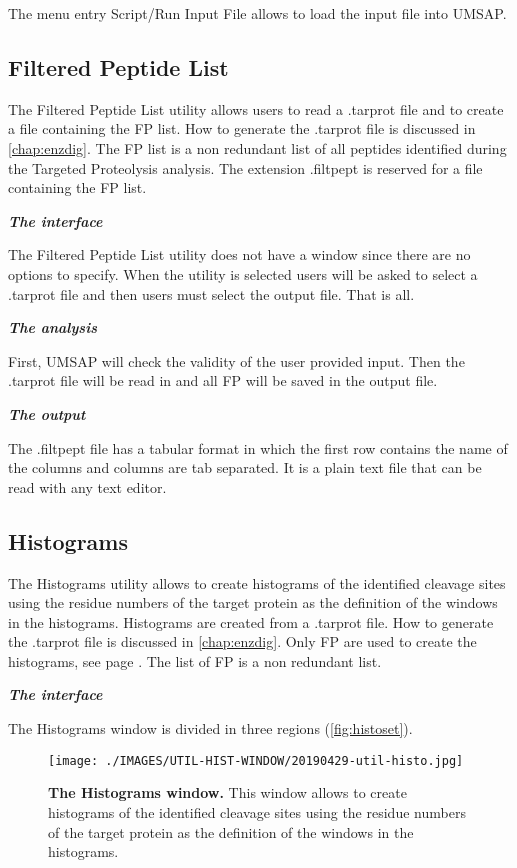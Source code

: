 The menu entry Script/Run Input File allows to load the input file into UMSAP.

\subsection{Filtered Peptide List}
\label{subsec:filtpeptfile}

The Filtered Peptide List utility allows users to read a .tarprot file and to create a file containing the FP list. How to generate the .tarprot file is discussed in \autoref{chap:enzdig}. The FP list is a non redundant list of all peptides identified during the Targeted Proteolysis analysis. The extension .filtpept is reserved for a file containing the FP list.

\textit{\textbf{The interface}}

The Filtered Peptide List utility does not have a window since there are no options to specify. When the utility is selected users will be asked to select a .tarprot file and then users must select the output file. That is all.

\textit{\textbf{The analysis}}

First, UMSAP will check the validity of the user provided input. Then the .tarprot file will be read in and all FP will be saved in the output file.

\textit{\textbf{The output}}

The .filtpept file has a tabular format in which the first row contains the name of the columns and columns are tab separated. It is a plain text file that can be read with any text editor.

\subsection{Histograms}
\label{subsec:histocut}
The Histograms utility allows to create histograms of the identified cleavage sites using the residue numbers of the target protein as the definition of the windows in the histograms. Histograms are created from a .tarprot file. How to generate the .tarprot file is discussed in \autoref{chap:enzdig}. Only FP are used to create the histograms, see page \pageref{par:PIP}. The list of FP is a non redundant list. 

\textit{\textbf{The interface}}

The Histograms window is divided in three regions (\autoref{fig:histoset}).

\begin{figure}[h]
	\centering
	\texttt{[image: ./IMAGES/UTIL-HIST-WINDOW/20190429-util-histo.jpg]}	    
	\caption[The Histograms window]{\textbf{The Histograms window.} This window allows to create histograms of the identified cleavage sites using the residue numbers of the target protein as the definition of the windows in the histograms.} 
	\label{fig:histoset}
	\vspace{-5pt} 	
\end{figure}

